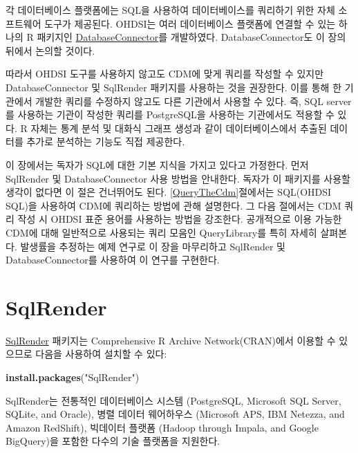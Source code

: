 \documentclass[10.5pt]{book}
\newenvironment{Shaded}{\begin{snugshade}}{\end{snugshade}}
\newcommand{\KeywordTok}[1]{\textcolor[rgb]{0.13,0.29,0.53}{\textbf{#1}}}
\newcommand{\StringTok}[1]{\textcolor[rgb]{0.31,0.60,0.02}{#1}}
\newcommand{\NormalTok}[1]{#1}
\theoremstyle{definition}
\theoremstyle{definition}
\theoremstyle{definition}
\theoremstyle{remark}
\begin{document}
각 데이터베이스 플랫폼에는 SQL을 사용하여 데이터베이스를 쿼리하기 위한
자체 소프트웨어 도구가 제공된다. OHDSI는 여러 데이터베이스 플랫폼에
연결할 수 있는 하나의 R 패키지인
\href{https://ohdsi.github.io/DatabaseConnector/}{DatabaseConnector}를
개발하였다. DatabaseConnector도 이 장의 뒤에서 논의할 것이다.

따라서 OHDSI 도구를 사용하지 않고도 CDM에 맞게 쿼리를 작성할 수 있지만
DatabaseConnector 및 SqlRender 패키지를 사용하는 것을 권장한다. 이를
통해 한 기관에서 개발한 쿼리를 수정하지 않고도 다른 기관에서 사용할 수
있다. 즉, SQL server를 사용하는 기관이 작성한 쿼리를 PostgreSQL을
사용하는 기관에서도 적용할 수 있다. R 자체는 통계 분석 및 대화식 그래프
생성과 같이 데이터베이스에서 추출된 데이터를 추가로 분석하는 기능도 직접
제공한다. 

이 장에서는 독자가 SQL에 대한 기본 지식을 가지고 있다고 가정한다. 먼저
SqlRender 및 DatabaseConnector 사용 방법을 안내한다. 독자가 이 패키지를
사용할 생각이 없다면 이 절은 건너뛰어도 된다. \ref{QueryTheCdm}절에서는
SQL(OHDSI SQL)을 사용하여 CDM에 쿼리하는 방법에 관해 설명한다. 그 다음
절에서는 CDM 쿼리 작성 시 OHDSI 표준 용어를 사용하는 방법을 강조한다.
공개적으로 이용 가능한 CDM에 대해 일반적으로 사용되는 쿼리 모음인
QueryLibrary를 특히 자세히 살펴본다. 발생률을 추정하는 예제 연구로 이
장을 마무리하고 SqlRender 및 DatabaseConnector를 사용하여 이 연구를
구현한다. 

\hypertarget{SqlRender}{\section{SqlRender}\label{SqlRender}}

\href{https://ohdsi.github.io/SqlRender/}{SqlRender} 패키지는
Comprehensive R Archive Network(CRAN)에서 이용할 수 있으므로 다음을
사용하여 설치할 수 있다:

\begin{Shaded}
\begin{Highlighting}[]
\KeywordTok{install.packages}\NormalTok{(}\StringTok{"SqlRender"}\NormalTok{)}
\end{Highlighting}
\end{Shaded}

SqlRender는 전통적인 데이터베이스 시스템 (PostgreSQL, Microsoft SQL
Server, SQLite, and Oracle), 병렬 데이터 웨어하우스 (Microsoft APS, IBM
Netezza, and Amazon RedShift), 빅데이터 플랫폼 (Hadoop through Impala,
and Google BigQuery)을 포함한 다수의 기술 플랫폼을 지원한다.
\end{document}
